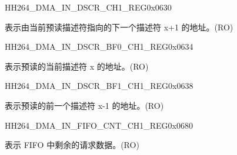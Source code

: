     
    \begin{register}{H}{H264\_DMA\_IN\_DSCR\_CH1\_REG}{0x0630}\label{regdesc:H264DMAINDSCRCH1REG}
    \regnewline%
    \begin{regdesc}\begin{reglist}
    \label{fielddesc:H264DMAINLINKDSCRCH1}\item [H264\_DMA\_INLINK\_DSCR\_CH1] 表示由当前预读描述符指向的下一个描述符 x+1 的地址。(RO)
    \end{reglist}\end{regdesc}
    \end{register}
    
    
    \begin{register}{H}{H264\_DMA\_IN\_DSCR\_BF0\_CH1\_REG}{0x0634}\label{regdesc:H264DMAINDSCRBF0CH1REG}
    \regnewline%
    \begin{regdesc}\begin{reglist}
    \label{fielddesc:H264DMAINLINKDSCRBF0CH1}\item [H264\_DMA\_INLINK\_DSCR\_BF0\_CH1] 表示预读的当前描述符 x 的地址。(RO)
    \end{reglist}\end{regdesc}
    \end{register}
    
    
    \begin{register}{H}{H264\_DMA\_IN\_DSCR\_BF1\_CH1\_REG}{0x0638}\label{regdesc:H264DMAINDSCRBF1CH1REG}
    \regnewline%
    \begin{regdesc}\begin{reglist}
    \label{fielddesc:H264DMAINLINKDSCRBF1CH1}\item [H264\_DMA\_INLINK\_DSCR\_BF1\_CH1] 表示预读的前一个描述符 x-1 的地址。(RO)
    \end{reglist}\end{regdesc}
    \end{register}
    
    \begin{register}{H}{H264\_DMA\_IN\_FIFO\_CNT\_CH1\_REG}{0x0680}\label{regdesc:H264DMAINFIFOCNTCH1REG}
    \regnewline%
    \begin{regdesc}\begin{reglist}
    \label{fielddesc:H264DMAINCMDFIFOINFIFOCNTCH1}\item [H264\_DMA\_IN\_CMDFIFO\_INFIFO\_CNT\_CH1] 表示 FIFO 中剩余的请求数据。(RO)
    \end{reglist}\end{regdesc}
    \end{register}
    
